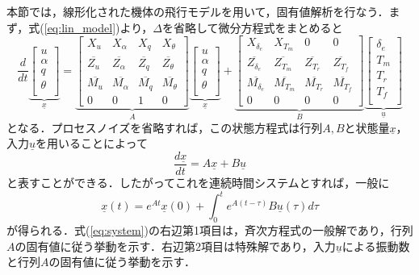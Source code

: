 本節では，線形化された機体の飛行モデルを用いて，固有値解析を行なう．まず，式(\ref{eq:lin_model})より，$\Delta$を省略して微分方程式をまとめると
\begin{equation}
  \dfrac{d}{dt}
  \underbrace{
  \left[
  \begin{array}{cccc}
    u \\
    \alpha \\
    q \\
    \theta \\
  \end{array}
  \right]}_{\underline{x}} =
  \underbrace{
  \left[
  \begin{array}{cccc}
    X_u & X_\alpha & X_q & X_\theta \\
    \overline{Z_u} & \overline{Z_\alpha} & \overline{Z_q} & \overline{Z_\theta} \\
    \overline{M_u} & \overline{M_\alpha} & \overline{M_q} & \overline{M_\theta} \\
    0 & 0 & 1 & 0
  \end{array}
  \right]}_{A}
  \underbrace{
  \left[
  \begin{array}{cccc}
    u \\
    \alpha \\
    q \\
    \theta \\
  \end{array}
  \right]}_{\underline{x}} +
  \underbrace{
  \left[
  \begin{array}{cccc}
    X_{\delta_e} & X_{T_m} & 0 & 0 \\
    \overline{Z_{\delta_e}} & \overline{Z_{T_m}} & \overline{Z_{T_r}} & \overline{Z_{T_f}} \\
    \overline{M_{\delta_e}} & \overline{M_{T_m}} & \overline{M_{T_r}} & \overline{M_{T_f}} \\
    0 & 0 & 0 & 0
  \end{array}
  \right]}_{B}
  \underbrace{
  \left[
  \begin{array}{cccc}
    \delta_e \\
    T_m \\
    T_r \\
    T_f \\
  \end{array}
  \right]}_{\underline{u}}
  \label{eq:system_eq}
\end{equation}
となる．プロセスノイズを省略すれば，この状態方程式は行列$A,B$と状態量$\underline{x}$，入力$\underline{u}$を用いることによって
\begin{equation}
  \dfrac{d\underline{x}}{dt} = A\underline{x} + B\underline{u}
\label{eq:matrix_A}
\end{equation}
と表すことができる．したがってこれを連続時間システムとすれば，一般に
\begin{equation}
  \underline{x}(t) = e^{At}\underline{x}(0) + \int_0^t e^{A(t-\tau)}B\underline{u}(\tau) d\tau
  \label{eq:system}
\end{equation}
が得られる．式(\ref{eq:system})の右辺第1項目は，斉次方程式の一般解であり，行列$A$の固有値に従う挙動を示す．右辺第2項目は特殊解であり，入力$\underline{u}$による振動数と行列$A$の固有値に従う挙動を示す．

